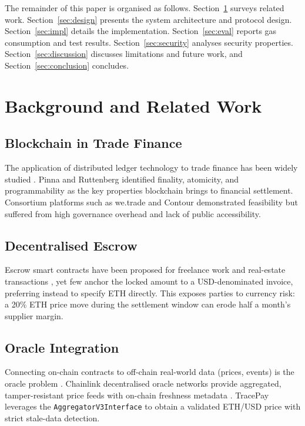 \documentclass[conference]{IEEEtran}
\begin{document}
The remainder of this paper is organised as follows.
Section~\ref{sec:background} surveys related work.
Section~\ref{sec:design} presents the system architecture and protocol
design.
Section~\ref{sec:impl} details the implementation.
Section~\ref{sec:eval} reports gas consumption and test results.
Section~\ref{sec:security} analyses security properties.
Section~\ref{sec:discussion} discusses limitations and future work, and
Section~\ref{sec:conclusion} concludes.

\section{Background and Related Work}
\label{sec:background}

\subsection{Blockchain in Trade Finance}

The application of distributed ledger technology to trade finance has
been widely studied \cite{guo2019,guo2024,luo2024}.
Pinna and Ruttenberg \cite{pinna2016} identified finality, atomicity,
and programmability as the key properties blockchain brings to
financial settlement.
Consortium platforms such as we.trade \cite{wetrade2022} and Contour
\cite{contour2020} demonstrated feasibility but suffered from high
governance overhead and lack of public accessibility.

\subsection{Decentralised Escrow}

Escrow smart contracts have been proposed for freelance work
\cite{cai2019} and real-estate transactions \cite{vos2017}, yet
few anchor the locked amount to a USD-denominated invoice,
preferring instead to specify ETH directly.
This exposes parties to currency risk: a 20\% ETH price move during
the settlement window can erode half a month's supplier margin.

\subsection{Oracle Integration}

Connecting on-chain contracts to off-chain real-world data (prices,
events) is the oracle problem \cite{zhang2016,caldarelli2020}.
Chainlink decentralised oracle networks provide aggregated,
tamper-resistant price feeds with on-chain freshness metadata
\cite{chainlink2021,chainlinkdocs}.
TracePay leverages the \texttt{AggregatorV3Interface} to obtain a validated
ETH/USD price with strict stale-data detection.
\end{document}
